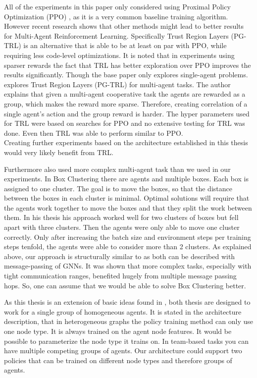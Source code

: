 All of the experiments in this paper only considered using Proximal Policy Optimization (PPO) \citet{SchulmanWDRK17}, as it is a very common baseline training algorithm.
However recent research shows that other methods might lead to better results for Multi-Agent Reinforcement Learning.
Specifically Trust Region Layers (PG-TRL) \citet{otto2021differentiable} is an alternative that is able to be at least on par with PPO, while requiring less code-level optimizations. It is noted that in experiments using sparser rewards the fact that TRL has better exploration over PPO improves the results significantly. Though the base paper only explores single-agent problems.
\citet{RobinRuede2021} explores Trust Region Layers (PG-TRL) \citet{otto2021differentiable} for multi-agent tasks. The author explains that given a multi-agent cooperative task the agents are rewarded as a group, which makes the reward more sparse. Therefore, creating correlation of a single agent's action and the group reward is harder. The hyper parameters used for TRL were based on searches for PPO and no extensive testing for TRL was done. Even then TRL was able to perform similar to PPO.\\
Creating further experiments based on the architecture established in this thesis would very likely benefit from TRL. \par

Furthermore \citet{RobinRuede2021} also used more complex multi-agent task than we used in our experiments. In Box Clustering there are agents and multiple boxes. Each box is assigned to one cluster. The goal is to move the boxes, so that the distance between the boxes in each cluster is minimal. Optimal solutions will require that the agents work together to move the boxes and that they split the work between them. In his thesis his approach worked well for two clusters of boxes but fell apart with three clusters. Then the agents were only able to move one cluster correctly. Only after increasing the batch size and environment steps per training steps tenfold, the agents were able to consider more than 2 clusters. As explained above, our approach is structurally similar to \citet{RobinRuede2021} as both can be described with message-passing of GNNs. It was shown that more complex tasks, especially with tight communication ranges, benefited hugely from multiple message passing hops. So, one can assume that we would be able to solve Box Clustering better.\par

As this thesis is an extension of basic ideas found in \citet{RobinRuede2021}, both thesis are designed to work for a single group of homogeneous agents. It is stated in the architecture description, that in heterogeneous graphs the policy training method can only use one node type. It is always trained on the agent node features. It would be possible to parameterize the node type it trains on. In team-based tasks you can have multiple competing groups of agents. Our architecture could support two policies that can be trained on different node types and therefore groups of agents. \par

